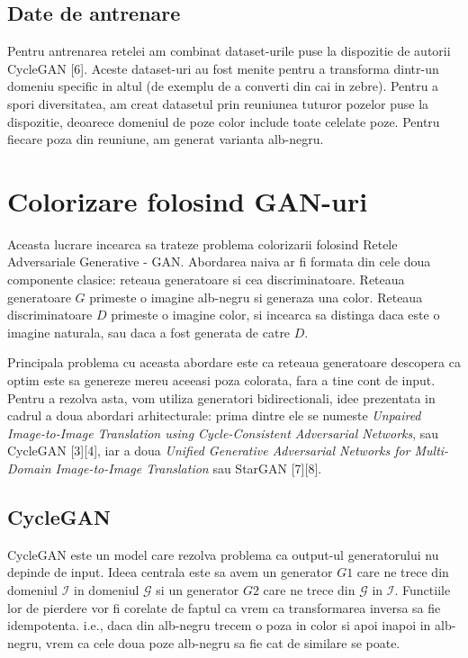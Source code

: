 \documentclass[12pt]{article}
\theoremstyle{definition}
\begin{document}
\subsection{Date de antrenare}

Pentru antrenarea retelei am combinat dataset-urile puse la dispozitie de autorii CycleGAN [6].
Aceste dataset-uri au fost menite pentru a transforma dintr-un domeniu specific in altul (de exemplu de a converti din cai in zebre).
Pentru a spori diversitatea, am creat datasetul prin reuniunea tuturor pozelor puse la dispozitie, deoarece domeniul de poze color include toate celelate poze.
Pentru fiecare poza din reuniune, am generat varianta alb-negru.

\section{Colorizare folosind GAN-uri}

Aceasta lucrare incearca sa trateze problema colorizarii folosind Retele Adversariale Generative - GAN.
Abordarea naiva ar fi formata din cele doua componente clasice: reteaua generatoare si cea discriminatoare.
Reteaua generatoare $G$ primeste o imagine alb-negru si generaza una color.
Reteaua discriminatoare $D$ primeste o imagine color, si incearca sa distinga daca este o imagine naturala, sau daca a fost generata de catre $D$.

Principala problema cu aceasta abordare este ca reteaua generatoare descopera ca optim este sa genereze mereu aceeasi poza colorata, fara a tine cont de input. Pentru a rezolva asta, vom utiliza generatori bidirectionali, idee prezentata in cadrul a doua abordari arhitecturale: prima dintre ele se numeste \textit{Unpaired Image-to-Image Translation using Cycle-Consistent Adversarial Networks}, sau CycleGAN [3][4], iar a doua \textit{Unified Generative Adversarial Networks for Multi-Domain Image-to-Image Translation} sau StarGAN [7][8].

\subsection{CycleGAN}

CycleGAN este un model care rezolva problema ca output-ul generatorului nu depinde de input.
Ideea centrala este sa avem un generator $G1$ care ne trece din domeniul $\mathcal{I}$ in domeniul $\mathcal{G}$ si un generator $G2$ care ne trece din $\mathcal{G}$ in $\mathcal{I}$.
Functiile lor de pierdere vor fi corelate de faptul ca vrem ca transformarea inversa sa fie idempotenta.
i.e., daca din alb-negru trecem o poza in color si apoi inapoi in alb-negru, vrem ca cele doua poze alb-negru sa fie cat de similare se poate.
\end{document}
